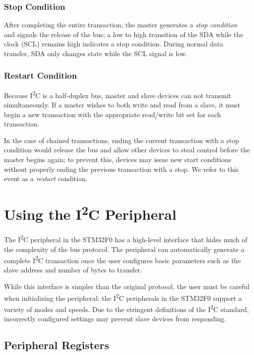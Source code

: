 \documentclass[openany,11pt,fleqn]{book} %
\begin{document}
        \subsubsection{Stop Condition}
        After completing the entire transaction, the master generates a \textit{stop condition} and signals the release of the bus; a low to high transition of the SDA while the clock (SCL) remains high indicates a stop condition. During normal data transfer, SDA only changes state while the SCL signal is low. 
        \subsubsection{Restart Condition}
        Because I\textsuperscript{2}C is a half-duplex bus, master and slave devices can not transmit simultaneously. If a master wishes to both write and read from a slave, it must begin a new transaction with the appropriate read/write bit set for each transaction. 
        
        In the case of chained transactions, ending the current transaction with a stop condition would release the bus and allow other devices to steal control before the master begins again; to prevent this, devices may issue new start conditions without properly ending the previous transaction with a stop. We refer to this event as a \textit{restart} condition. 

\section{Using the I\textsuperscript{2}C Peripheral}
    The I\textsuperscript{2}C peripheral in the STM32F0 has a high-level interface that hides much of the complexity of the bus protocol. The peripheral can automatically generate a complete I\textsuperscript{2}C transaction once the user configures basic parameters such as the slave address and number of bytes to transfer. 
    
    While this interface is simpler than the original protocol, the user must be careful when initializing the peripheral: the I\textsuperscript{2}C peripherals in the STM32F0 support a variety of modes and speeds. Due to the stringent definitions of the I\textsuperscript{2}C standard, incorrectly configured settings may prevent slave devices from responding.

\subsection{Peripheral Registers}
\end{document}
